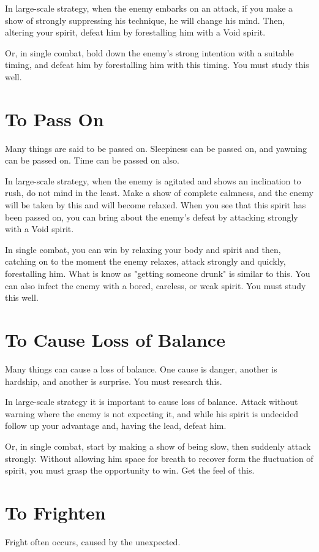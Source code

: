 \documentclass[12pt]{report}
\begin{document}
In large-scale strategy, when the enemy embarks on an attack, if you make a show of strongly suppressing his technique, he will change his mind. Then, altering your spirit, defeat him by forestalling him with a Void spirit.

Or, in single combat, hold down the enemy's strong intention with a suitable timing, and defeat him by forestalling him with this timing. You must study this well.
\section*{To Pass On}
Many things are said to be passed on. Sleepiness can be passed on, and yawning can be passed on. Time can be passed on also.

In large-scale strategy, when the enemy is agitated and shows an inclination to rush, do not mind in the least. Make a show of complete calmness, and the enemy will be taken by this and will become relaxed. When you see that this spirit has been passed on, you can bring about the enemy's defeat by attacking strongly with a Void spirit.

In single combat, you can win by relaxing your body and spirit and then, catching on to the moment the enemy relaxes, attack strongly and quickly, forestalling him. What is know as "getting someone drunk" is similar to this. You can also infect the enemy with a bored, careless, or weak spirit. You must study this well.
\section*{To Cause Loss of Balance}
Many things can cause a loss of balance. One cause is danger, another is hardship, and another is surprise. You must research this.

In large-scale strategy it is important to cause loss of balance. Attack without warning where the enemy is not expecting it, and while his spirit is undecided follow up your advantage and, having the lead, defeat him.

Or, in single combat, start by making a show of being slow, then suddenly attack strongly. Without allowing him space for breath to recover form the fluctuation of spirit, you must grasp the opportunity to win. Get the feel of this.
\section*{To Frighten}
Fright often occurs, caused by the unexpected.
\end{document}
